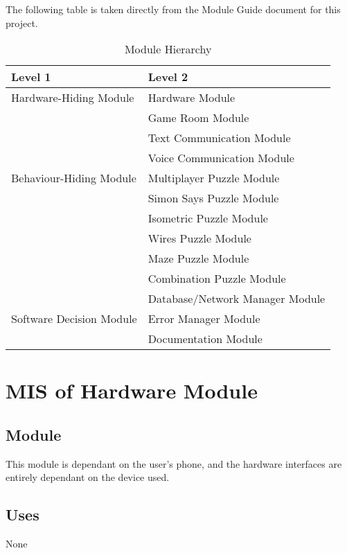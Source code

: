 \documentclass[12pt, titlepage]{article}
\begin{document}
The following table is taken directly from the Module Guide document for this project.

\begin{table}[h!]
\centering
\begin{tabular}{p{} p{}}
\toprule
\textbf{Level 1} & \textbf{Level 2}\\
\midrule

{Hardware-Hiding Module} & Hardware Module \\
\midrule

\multirow{7}{0.3\textwidth}{Behaviour-Hiding Module}
& Game Room Module\\
& Text Communication Module\\
& Voice Communication Module\\
& Multiplayer Puzzle Module\\
& Simon Says Puzzle Module\\
& Isometric Puzzle Module\\
& Wires Puzzle Module\\
& Maze Puzzle Module\\
& Combination Puzzle Module\\
\midrule

\multirow{3}{0.3\textwidth}{Software Decision Module} & Database/Network Manager Module\\
& Error Manager Module\\
& Documentation Module\\
\bottomrule

\end{tabular}
\caption{Module Hierarchy}
\label{TblMH}
\end{table}

\newpage

\section{MIS of {Hardware Module}} \label{sec:HardwareModule} 

\subsection{Module}

This module is dependant on the user's phone, and the hardware interfaces are entirely dependant on the device used. 

\subsection{Uses}
 None
\end{document}
